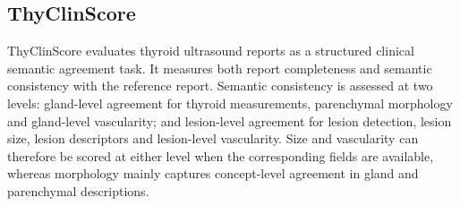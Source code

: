 \documentclass[fleqn,10pt]{wlscirep}
\begin{document}

\subsection{ThyClinScore}
ThyClinScore evaluates thyroid ultrasound reports as a structured clinical semantic agreement task. It measures both report completeness and semantic consistency with the reference report. Semantic consistency is assessed at two levels: gland-level agreement for thyroid measurements, parenchymal morphology and gland-level vascularity; and lesion-level agreement for lesion detection, lesion size, lesion descriptors and lesion-level vascularity. Size and vascularity can therefore be scored at either level when the corresponding fields are available, whereas morphology mainly captures concept-level agreement in gland and parenchymal descriptions.
\end{document}
